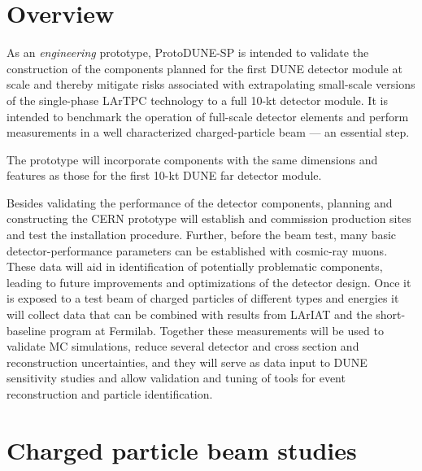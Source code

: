 
\section{Overview}

As an \textit{engineering} prototype, ProtoDUNE-SP is
intended to validate the construction of the components planned for the
first DUNE  detector module at scale and thereby mitigate
risks associated with extrapolating small-scale versions of the
single-phase LArTPC technology to a full 10-kt detector module.  It is
intended to benchmark the operation of full-scale detector
elements and perform measurements in a well characterized
charged-particle beam --- an essential step.

The prototype will incorporate components with the same
dimensions and features as those for the first 10-kt DUNE far detector
module.

Besides validating the performance of the detector components,
planning and constructing the CERN prototype will establish and
commission production sites and test the installation procedure.
Further, before the beam test, many basic detector-performance
parameters can be established with cosmic-ray muons.  These data will
aid in identification of potentially problematic components, leading
to future improvements and optimizations of the detector design.  Once
it is exposed to a test beam of charged particles of different types
and energies it will collect data that can be combined with results
from LArIAT and the short-baseline program at Fermilab.  Together
these measurements will be used to validate MC simulations, reduce several detector and cross section and reconstruction uncertainties, and they
will serve as data input to DUNE sensitivity studies and allow
validation and tuning of tools for event reconstruction and particle
identification.

\section{Charged particle beam studies}

